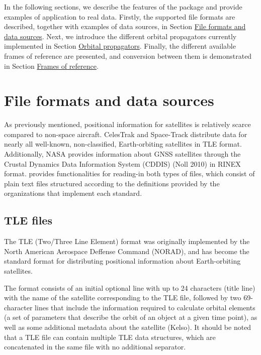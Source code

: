 In the following sections, we describe the features of the package and provide examples of application to real data. Firstly, the supported file formats are described, together with examples of data sources, in Section \protect\hyperlink{file-formats-and-data-sources}{File formats and data sources}. Next, we introduce the different orbital propagators currently implemented in Section \protect\hyperlink{orbital-propagators}{Orbital propagators}. Finally, the different available frames of reference are presented, and conversion between them is demonstrated in Section \protect\hyperlink{frames-of-reference}{Frames of reference}.

\hypertarget{file-formats-and-data-sources}{%
\section{File formats and data sources}\label{file-formats-and-data-sources}}

As previously mentioned, positional information for satellites is relatively scarce compared to non-space aircraft. CelesTrak and Space-Track distribute data for nearly all well-known, non-classified, Earth-orbiting satellites in TLE format. Additionally, NASA provides information about GNSS satellites through the Crustal Dynamics Data Information System (CDDIS) (Noll 2010) in RINEX format.  provides functionalities for reading-in both types of files, which consist of plain text files structured according to the definitions provided by the organizations that implement each standard.

\hypertarget{tle-files}{%
\subsection{TLE files}\label{tle-files}}

The TLE (Two/Three Line Element) format was originally implemented by the North American Aerospace Deffense Command (NORAD), and has become the standard format for distributing positional information about Earth-orbiting satellites.

The format consists of an initial optional line with up to 24 characters (title line) with the name of the satellite corresponding to the TLE file, followed by two 69-character lines that include the information required to calculate orbital elements (a set of parameters that describe the orbit of an object at a given time point), as well as some additional metadata about the satellite (Kelso). It should be noted that a TLE file can contain multiple TLE data structures, which are concatenated in the same file with no additional separator.

